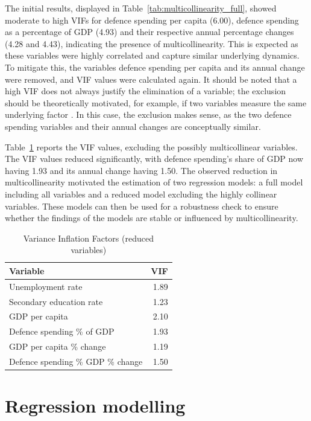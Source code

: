 The initial results, displayed in Table~\ref{tab:multicollinearity_full}, showed moderate to high VIFs for defence spending per capita (6.00), defence spending as a percentage of GDP (4.93) and their respective annual percentage changes (4.28 and 4.43), indicating the presence of multicollinearity. 
This is expected as these variables were highly correlated and capture similar underlying dynamics.
To mitigate this, the variables defence spending per capita and its annual change were removed, and VIF values were calculated again.
It should be noted that a high VIF does not always justify the elimination of a variable; the exclusion should be theoretically motivated, for example, if two variables measure the same underlying factor \parencite{obrien_caution_2007}. 
In this case, the exclusion makes sense, as the two defence spending variables and their annual changes are conceptually similar.

Table~\ref{tab:multicollinearity_reduced} reports the VIF values, excluding the possibly multicollinear variables.
The VIF values reduced significantly, with defence spending's share of GDP now having 1.93 and its annual change having 1.50. 
The observed reduction in multicollinearity motivated the estimation of two regression models: a full model including all variables and a reduced model excluding the highly collinear variables.
These models can then be used for a robustness check to ensure whether the findings of the models are stable or influenced by multicollinearity.

\begin{table}[ht]
\caption{Variance Inflation Factors (reduced variables)}
\small
\centering
\begin{tabularx}{\textwidth}{l r}
\toprule
\textbf{Variable} & \textbf{VIF} \\
\midrule
Unemployment rate & 1.89 \\
Secondary education rate & 1.23 \\
GDP per capita & 2.10 \\
Defence spending \% of GDP & 1.93 \\
GDP per capita \% change & 1.19 \\
Defence spending \% GDP \% change & 1.50 \\
\bottomrule
\end{tabularx}
\label{tab:multicollinearity_reduced}
\end{table}

\section{Regression modelling}

